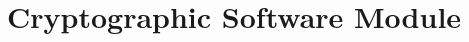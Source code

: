 \documentclass[11pt,a4paper]{report}
\theoremstyle{definitionstyle}
\begin{document}
%
%
%
%
%

\newpage
\chapter{Cryptographic Software Module}

\end{document}

